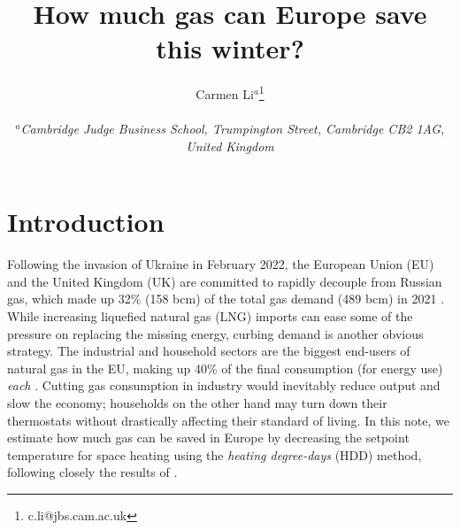 \documentclass[12pt]{article}
\title{ {\bf How much gas can Europe save this winter?}}
\author{Carmen Li$^{a}$\footnote{c.li@jbs.cam.ac.uk} 
\\ \\  \small \sl  $^a$Cambridge Judge Business School, Trumpington Street, Cambridge CB2 1AG, United Kingdom}
\date{}
\begin{document}










\section{Introduction}
Following the invasion of Ukraine in February 2022, the European Union (EU) and the United Kingdom (UK) are committed to rapidly decouple from Russian gas, which made up 32\% (158 bcm) of the total gas demand (489 bcm) in 2021 \cite{IEA}. While increasing liquefied natural gas (LNG) imports can ease some of the pressure on replacing the missing energy, curbing demand is another obvious strategy. The industrial and household sectors are the biggest end-users of natural gas in the EU, making up 40\% of the final consumption (for energy use) \textit{each} \cite{Eurostat_sankey}. Cutting gas consumption in industry would inevitably reduce output and slow the economy; households on the other hand may turn down their thermostats without drastically affecting their standard of living. In this note, we estimate how much gas can be saved in Europe by decreasing the setpoint temperature for space heating using the \textit{heating degree-days} (HDD) method, following closely the results of \cite{KOZARCANIN2019368}. 
\end{document}
